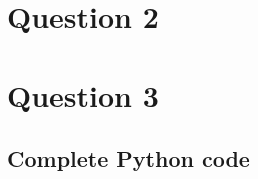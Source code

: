 \documentclass[letterpaper,headings=standardclasses]{scrartcl}
\begin{document}
\section{Question 2}



\section{Question 3}

\subsection{Complete Python code}


\end{document}
